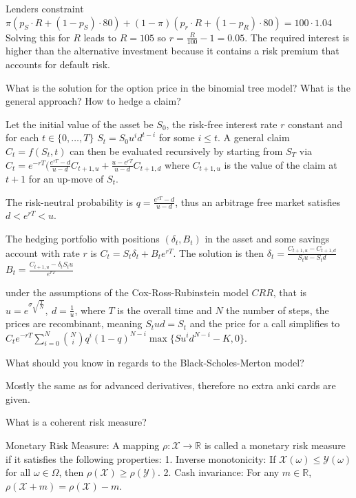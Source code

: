 Lenders constraint
\( \pi(p_S\cdot R + (1-p_S)\cdot 80) + (1 - \pi)(p_r \cdot R + (1 - p_R)\cdot 80) = 100\cdot 1.04 \)
Solving this for \( R \) leads to 
\( R = 105 \) so \( r = \frac{R}{100} - 1 = 0.05 \).
The required interest is higher than the alternative investment because it contains a risk premium that accounts for default risk.



What is the solution for the option price in the binomial tree model? 
What is the general approach? How to hedge a claim?

Let the initial value of the asset be \( S_0 \), the risk-free interest rate \( r \) constant and for each \( t \in \{0, \dots, T\} \)
\( S_t = S_0u^{i}d^{t-i} \) for some \( i \leq t \). A general claim \( C_t = f(S_t, t) \) can then be evaluated recursively
by starting from \( S_T \) via \( C_t = e^{-rT}(\frac{e^{rT} - d}{u - d}C_{t+1,u} + \frac{u - e^{rT}}{u - d}C_{t+1,d} \)
where \( C_{t+1,u} \) is the value of the claim at \( t+1 \) for an up-move of \( S_t \).

The risk-neutral probability is \( q = \frac{e^{rT} - d}{u - d} \), thus an arbitrage free market satisfies \( d < e^{rT} < u \).

The hedging portfolio with positions \( (\delta_t,B_t) \) in the asset and some savings account with rate \( r \)
is \( C_t = S_t\delta_t + B_te^{rT}\). The solution is then
\( \delta_t = \frac{C_{t+1,u} - C_{t+1,d}}{S_tu - S_td} \)
\( B_t = \frac{C_{t+1,u} - \delta_t S_t u}{e^{rT}} \)

under the assumptions of the Cox-Ross-Rubinstein model \( CRR \), that is \( u = e^{\sigma\sqrt{\frac{T}{N}}},\ d = \frac{1}{u} \),
where \( T \) is the overall time and \( N \) the number of steps, the prices are recombinant, meaning \( S_t ud = S_t \) and
the price for a call simplifies to
\( C_t e^{-rT} \sum_{i=0}^N \binom{N}{i}q^i(1 - q)^{N-i}\max\{Su^id^{N-i} - K, 0\}\).



What should you know in regards to the Black-Scholes-Merton model?

Mostly the same as for advanced derivatives, therefore no extra anki cards are given.




What is a coherent risk measure?

Monetary Risk Measure:
A mapping \(\rho : \mathcal{X} \to \mathbb{R}\) is called a monetary risk measure if it satisfies the following properties:  
1. Inverse monotonicity: If \(\mathcal{X}(\omega) \leq \mathcal{Y}(\omega)\) for all \(\omega \in \Omega\), then 
   \(\rho(\mathcal{X}) \geq \rho(\mathcal{Y})\).  
2. Cash invariance: For any \(m \in \mathbb{R}\), \(\rho(\mathcal{X} + m) = \rho(\mathcal{X}) - m\).


